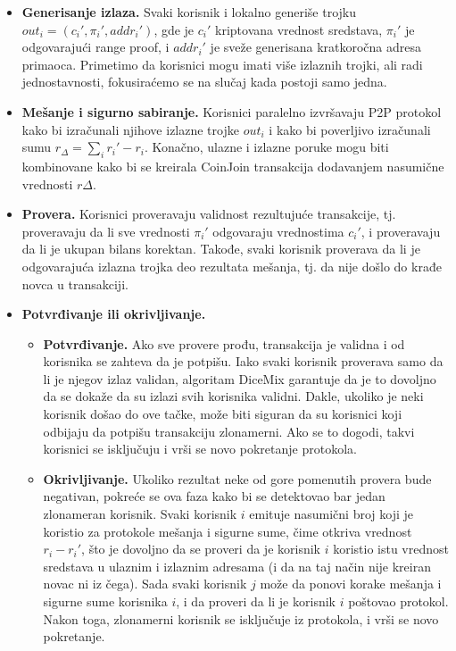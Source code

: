 \documentclass[a4paper]{article}
\begin{document}
\begin{itemize}
	\item \textbf{Generisanje izlaza.} Svaki korisnik i lokalno generiše trojku $out_i = (c_i', \pi_i', addr_i')$, gde je $c_i'$ kriptovana vrednost sredstava, $\pi_i'$ je odgovarajući range proof, i $addr_i'$ je sveže generisana kratkoročna adresa primaoca. Primetimo da korisnici mogu imati više izlaznih trojki, ali radi jednostavnosti, fokusiraćemo se na slučaj kada postoji samo jedna.
	\item \textbf{Mešanje i sigurno sabiranje.} Korisnici paralelno izvršavaju P2P protokol kako bi izračunali njihove izlazne trojke $out_i$ i kako bi poverljivo izračunali sumu $r_\Delta = \sum_{i} r_i' - r_i$. Konačno, ulazne i izlazne poruke mogu biti kombinovane kako bi se kreirala CoinJoin transakcija dodavanjem nasumične vrednosti $r\Delta$.
	\item \textbf{Provera.} Korisnici proveravaju validnost rezultujuće transakcije, tj. proveravaju da li sve vrednosti $\pi_i'$ odgovaraju vrednostima $c_i'$, i proveravaju da li je ukupan bilans korektan. Takođe, svaki korisnik proverava da li je odgovarajuća izlazna trojka deo rezultata mešanja, tj. da nije došlo do krađe novca u transakciji.
	\item \textbf{Potvrđivanje ili okrivljivanje.}
		\begin{itemize}
			\item \textbf{Potvrđivanje.} Ako sve provere prođu, transakcija je validna i od korisnika se zahteva da je potpišu. Iako svaki korisnik proverava samo da li je njegov izlaz validan, algoritam DiceMix garantuje da je to dovoljno da se dokaže da su izlazi svih korisnika validni. Dakle, ukoliko je neki korisnik došao do ove tačke, može biti siguran da su korisnici koji odbijaju da potpišu transakciju zlonamerni. Ako se to dogodi, takvi korisnici se isključuju i vrši se novo pokretanje protokola.
			\item \textbf{Okrivljivanje.} Ukoliko rezultat neke od gore pomenutih provera bude negativan, pokreće se ova faza kako bi se detektovao bar jedan zlonameran korisnik. Svaki korisnik $i$ emituje nasumični broj koji je koristio za protokole mešanja i sigurne sume, čime otkriva vrednost $r_i - r_i'$, što je dovoljno da se proveri da je korisnik $i$ koristio istu vrednost sredstava u ulaznim i izlaznim adresama (i da na taj način nije kreiran novac ni iz čega). Sada svaki korisnik $j$ može da ponovi korake mešanja i sigurne sume korisnika $i$, i da proveri da li je korisnik $i$ poštovao protokol. Nakon toga, zlonamerni korisnik se isključuje iz protokola, i vrši se novo pokretanje. 
		\end{itemize}	
\end{itemize}
\end{document}
